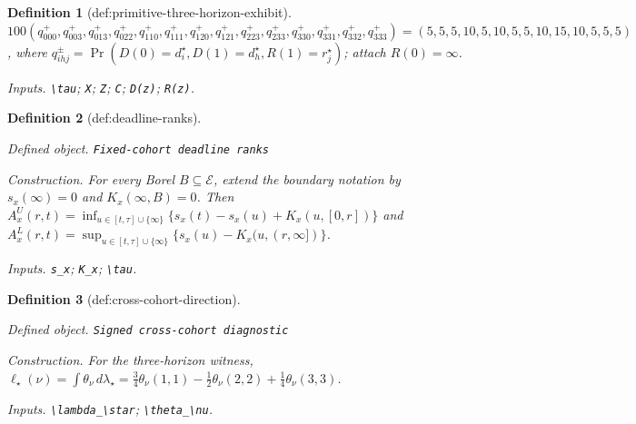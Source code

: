 \documentclass{article}
\newtheorem{definition}{Definition}
\begin{document}
\begin{definition}[def:primitive-three-horizon-exhibit]
\(100(q^+_{000},q^+_{003},q^+_{013},q^+_{022},q^+_{110},q^+_{111},q^+_{120},q^+_{121},q^+_{223},q^+_{233},q^+_{330},q^+_{331},q^+_{332},q^+_{333})=(5,5,5,10,5,10,5,5,10,15,10,5,5,5)\), where \(q^\pm_{ihj}=\Pr(D(0)=d_i^\star,D(1)=d_h^\star,R(1)=r_j^\star)\); attach \(R(0)=\infty\).
\par\smallskip\noindent\emph{Inputs.} \texttt{\textbackslash{}\allowbreak{}tau}; \texttt{X}; \texttt{Z}; \texttt{C}; \texttt{D(z)}; \texttt{R(z)}.
\end{definition}

\begin{definition}[def:deadline-ranks]\label{def:deadline-ranks}
\par\smallskip\noindent\emph{Defined object.} \texttt{Fixed-\allowbreak{}cohort deadline ranks}
\par\smallskip\noindent\emph{Construction.} For every Borel \(B\subseteq\mathcal E\), extend the boundary notation by \(s_x(\infty)=0\) and \(K_x(\infty,B)=0\).  Then \(A^U_x(r,t)=\inf_{u\in[t,\tau]\cup\{\infty\}}\{s_x(t)-s_x(u)+K_x(u,[0,r])\}\) and \(A^L_x(r,t)=\sup_{u\in[t,\tau]\cup\{\infty\}}\{s_x(u)-K_x(u,(r,\infty])\}\).
\par\smallskip\noindent\emph{Inputs.} \texttt{s\_\allowbreak{}x}; \texttt{K\_\allowbreak{}x}; \texttt{\textbackslash{}\allowbreak{}tau}.
\end{definition}

\begin{definition}[def:cross-cohort-direction]\label{def:cross-cohort-direction}
\par\smallskip\noindent\emph{Defined object.} \texttt{Signed cross-\allowbreak{}cohort diagnostic}
\par\smallskip\noindent\emph{Construction.} For the three-horizon witness, \(\ell_\star(\nu)=\int\theta_\nu\,d\lambda_\star=\tfrac34\theta_\nu(1,1)-\tfrac12\theta_\nu(2,2)+\tfrac14\theta_\nu(3,3)\).
\par\smallskip\noindent\emph{Inputs.} \texttt{\textbackslash{}\allowbreak{}lambda\_\allowbreak{}\textbackslash{}\allowbreak{}star}; \texttt{\textbackslash{}\allowbreak{}theta\_\allowbreak{}\textbackslash{}\allowbreak{}nu}.
\end{definition}
\end{document}
